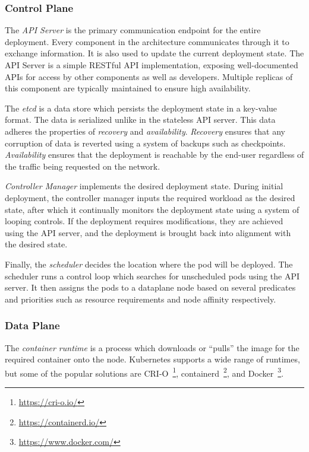 \subsubsection{Control Plane}
\label{subsubsec:ch2-k8s-control-plane}
The \textit{API Server} is the primary communication endpoint for the entire deployment. Every component in the architecture communicates through it to exchange information. It is also used to update the current deployment state. The API Server is a simple RESTful API implementation, exposing well-documented APIs for access by other components as well as developers. Multiple replicas of this component are typically maintained to ensure high availability.\par

The \textit{etcd} is a data store which persists the deployment state in a key-value format. The data is serialized unlike in the stateless API server. This data adheres the properties of \textit{recovery} and \textit{availability}. \textit{Recovery} ensures that any corruption of data is reverted using a system of backups such as checkpoints. \textit{Availability} ensures that the deployment is reachable by the end-user regardless of the traffic being requested on the network.\par

\textit{Controller Manager} implements the desired deployment state. During initial deployment, the controller manager inputs the required workload as the desired state, after which it continually monitors the deployment state using a system of looping controls. If the deployment requires modifications, they are achieved using the API server, and the deployment is brought back into alignment with the desired state.\par

Finally, the \textit{scheduler} decides the location where the pod will be deployed. The scheduler runs a control loop which searches for unscheduled pods using the API server. It then assigns the pods to a dataplane node based on several predicates and priorities such as resource requirements and node affinity respectively.

\subsubsection{Data Plane}
\label{subsubsec:ch2-k8s-data-plane}

The \textit{container runtime} is a process which downloads or ``pulls'' the image for the required container onto the node. Kubernetes supports a wide range of runtimes, but some of the popular solutions are CRI-O~\footnote{\url{https://cri-o.io/}}, containerd~\footnote{\url{https://containerd.io/}}, and Docker~\footnote{\url{https://www.docker.com/}}.\par


